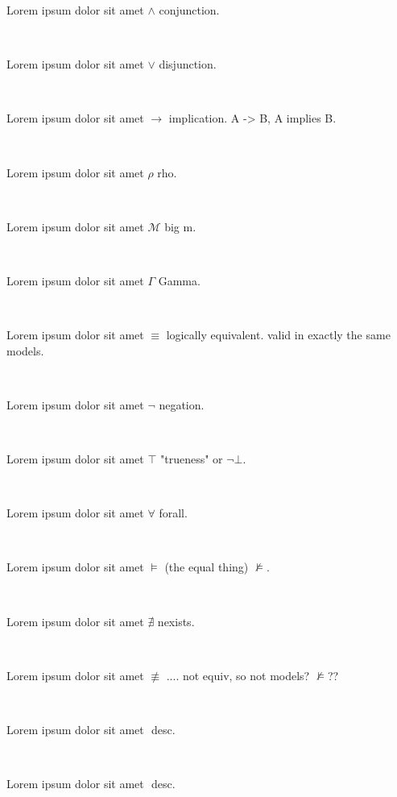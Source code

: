\documentclass[12pt]{article}
\begin{document}
Lorem ipsum dolor sit amet $ \wedge $ conjunction.

\centerline{~}

Lorem ipsum dolor sit amet $ \vee $ disjunction.

\centerline{~}

Lorem ipsum dolor sit amet $ \rightarrow $ implication.  A -> B,  A implies B.

\centerline{~}

Lorem ipsum dolor sit amet $ \rho $ rho.

\centerline{~}

Lorem ipsum dolor sit amet $ \mathcal{M} $ big m.

\centerline{~}

Lorem ipsum dolor sit amet $ \Gamma $ Gamma.

\centerline{~}

Lorem ipsum dolor sit amet $ \equiv $ logically equivalent. valid in exactly the same models.

\centerline{~}

Lorem ipsum dolor sit amet $ \neg $ negation.

\centerline{~}

Lorem ipsum dolor sit amet $ \top $ "trueness" or $ \neg \bot $.

\centerline{~}

Lorem ipsum dolor sit amet $ \forall $ forall.

\centerline{~}

Lorem ipsum dolor sit amet $ \models $ (the equal thing) $ \nvDash $.

\centerline{~}

Lorem ipsum dolor sit amet $ \nexists $ nexists.

\centerline{~}

Lorem ipsum dolor sit amet $ \not\equiv $ .... not equiv, so not models? $ \not\models $??

\centerline{~}

Lorem ipsum dolor sit amet $  $ desc.

\centerline{~}

Lorem ipsum dolor sit amet $  $ desc.

\centerline{~}
\end{document}
